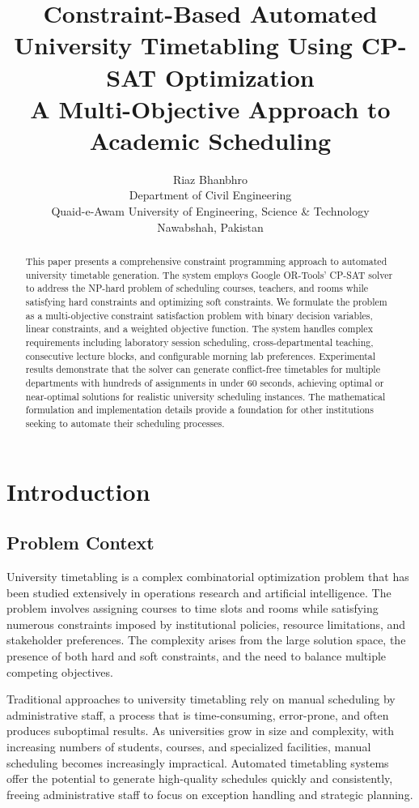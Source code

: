 \documentclass[12pt,a4paper]{article}
\title{\textbf{Constraint-Based Automated University Timetabling Using CP-SAT Optimization}\\
\large A Multi-Objective Approach to Academic Scheduling}
\author{Riaz Bhanbhro\\
Department of Civil Engineering\\
Quaid-e-Awam University of Engineering, Science \& Technology\\
Nawabshah, Pakistan}
\date{}
\begin{document}
\maketitle

\begin{abstract}
This paper presents a comprehensive constraint programming approach to automated university timetable generation. The system employs Google OR-Tools' CP-SAT solver to address the NP-hard problem of scheduling courses, teachers, and rooms while satisfying hard constraints and optimizing soft constraints. We formulate the problem as a multi-objective constraint satisfaction problem with binary decision variables, linear constraints, and a weighted objective function. The system handles complex requirements including laboratory session scheduling, cross-departmental teaching, consecutive lecture blocks, and configurable morning lab preferences. Experimental results demonstrate that the solver can generate conflict-free timetables for multiple departments with hundreds of assignments in under 60 seconds, achieving optimal or near-optimal solutions for realistic university scheduling instances. The mathematical formulation and implementation details provide a foundation for other institutions seeking to automate their scheduling processes.
\end{abstract}

\newpage

\section{Introduction}

\subsection{Problem Context}

University timetabling is a complex combinatorial optimization problem that has been studied extensively in operations research and artificial intelligence. The problem involves assigning courses to time slots and rooms while satisfying numerous constraints imposed by institutional policies, resource limitations, and stakeholder preferences. The complexity arises from the large solution space, the presence of both hard and soft constraints, and the need to balance multiple competing objectives.

Traditional approaches to university timetabling rely on manual scheduling by administrative staff, a process that is time-consuming, error-prone, and often produces suboptimal results. As universities grow in size and complexity, with increasing numbers of students, courses, and specialized facilities, manual scheduling becomes increasingly impractical. Automated timetabling systems offer the potential to generate high-quality schedules quickly and consistently, freeing administrative staff to focus on exception handling and strategic planning.
\end{document}
